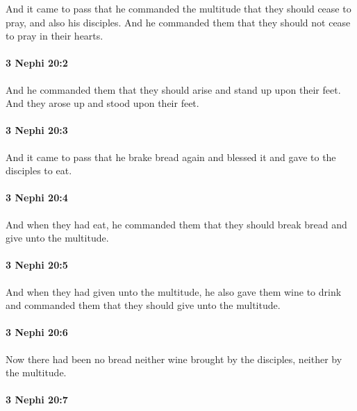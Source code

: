 			And it came to pass that he commanded the multitude
			that they should cease to pray, and also his disciples.
			And he commanded them that they should not cease to pray in their hearts.

		\paragraph{3 Nephi 20:2} %
			\label{3NEPHI-20-2}

			And he commanded them that they should arise and stand up upon their feet.
			And they arose up and stood upon their feet.

		\paragraph{3 Nephi 20:3} %
			\label{3NEPHI-20-3}

			And it came to pass that he brake bread again
			and blessed it and gave to the disciples to eat.

		\paragraph{3 Nephi 20:4} %
			\label{3NEPHI-20-4}

			And when they had eat,
			he commanded them that they should break bread
			and give unto the multitude.

		\paragraph{3 Nephi 20:5} %
			\label{3NEPHI-20-5}

			And when they had given unto the multitude,
			he also gave them wine to drink
			and commanded them that they should give unto the multitude.

		\paragraph{3 Nephi 20:6} %
			\label{3NEPHI-20-6}

			Now there had been no bread neither wine
			brought by the disciples, neither by the multitude.

		\paragraph{3 Nephi 20:7} %
			\label{3NEPHI-20-7}

